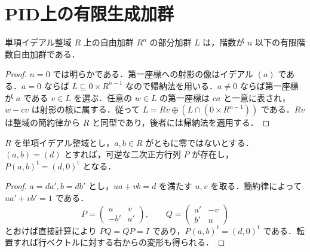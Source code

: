 \section{PID上の有限生成加群}
\begin{prop}[自由加群の部分加群]
単項イデアル整域 $R$ 上の自由加群 $R^n$ の部分加群 $L$ は，階数が $n$ 以下の有限階数自由加群である．
\end{prop}
\begin{proof}
$n=0$ では明らかである．第一座標への射影の像はイデアル $(a)$ である．$a=0$ ならば $L\subseteq 0\times R^{n-1}$ なので帰納法を用いる．$a\ne0$ ならば第一座標が $a$ である $v\in L$ を選ぶ．任意の $w\in L$ の第一座標は $ca$ と一意に表され，$w-cv$ は射影の核に属する．従って $L=Rv\oplus(L\cap(0\times R^{n-1}))$ である．$Rv$ は整域の簡約律から $R$ と同型であり，後者には帰納法を適用する．
\end{proof}
\begin{prop}[Bezout変形]
$R$ を単項イデアル整域とし，$a,b\in R$ がともに零ではないとする．$(a,b)=(d)$ とすれば，可逆な二次正方行列 $P$ が存在し，$P(a,b)^{\mathrm t}=(d,0)^{\mathrm t}$ となる．
\end{prop}
\begin{proof}
$a=da',b=db'$ とし，$ua+vb=d$ を満たす $u,v$ を取る．簡約律によって $ua'+vb'=1$ である．
\[
P=\begin{pmatrix}u&v\\-b'&a'\end{pmatrix},\qquad
Q=\begin{pmatrix}a'&-v\\b'&u\end{pmatrix}
\]
とおけば直接計算により $PQ=QP=I$ であり，$P(a,b)^{\mathrm t}=(d,0)^{\mathrm t}$ である．転置すれば行ベクトルに対する右からの変形も得られる．
\end{proof}
